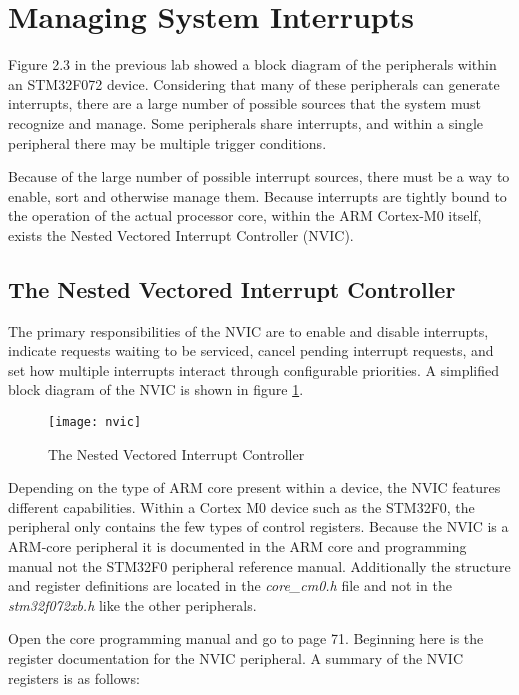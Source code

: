 \documentclass[11pt,fleqn]{book} %
\begin{document}
\section{Managing System Interrupts}
Figure 2.3 in the previous lab showed a block diagram of the peripherals within an STM32F072 device. Considering that many of these peripherals can generate interrupts, there are a large number of possible sources that the system must recognize and manage. Some peripherals share interrupts, and within a single peripheral there may be multiple trigger conditions.  

Because of the large number of possible interrupt sources, there must be a way to enable, sort and otherwise manage them. Because interrupts are tightly bound to the operation of the actual processor core, within the ARM Cortex-M0 itself, exists the Nested Vectored Interrupt Controller (NVIC).

\subsection{The Nested Vectored Interrupt Controller}
The primary responsibilities of the NVIC are to enable and disable interrupts, indicate requests waiting to be serviced, cancel pending interrupt requests, and set how multiple interrupts interact through configurable priorities. A simplified block diagram of the NVIC is shown in figure \ref{nvic}.
    
\begin{figure}[h]
    \centering\texttt{[image: nvic]}
    \caption{The Nested Vectored Interrupt Controller}
    \label{nvic}
\end{figure}

Depending on the type of ARM core present within a device, the NVIC features different capabilities. Within a Cortex M0 device such as the STM32F0, the peripheral only contains the few types of control registers. Because the NVIC is a ARM-core peripheral it is documented in the ARM core and programming manual not the STM32F0 peripheral reference manual. Additionally the structure and register definitions are located in the \textit{core\_cm0.h} file and not in the \textit{stm32f072xb.h} like the other peripherals.  

Open the core programming manual and go to page 71. Beginning here is the register documentation for the NVIC peripheral. A summary of the NVIC registers is as follows:
\end{document}
